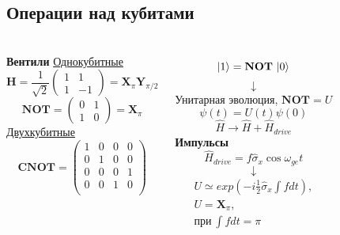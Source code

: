 \documentclass[aspectratio=169, 13pt]{beamer}
\DeclarePairedDelimiter\ket{\lvert}{\rangle}
\begin{document}
\subsection{Операции над кубитами}
\begin{frame}[c]\frametitle{\secname}\framesubtitle{\subsecname}
\begin{columns}[c]
\centering
\textbf{Вентили} 
\newline
\underline{Однокубитные}
$$
\mathbf{H} = \frac{1}{\sqrt{2}}
\begin{pmatrix}
1 & 1 \\
1 & -1
\end{pmatrix}
= \mathbf{X}_{\pi} \mathbf{Y}_{\pi / 2}
$$
$$
\mathbf{NOT} = 
\begin{pmatrix}
0 & 1 \\
1 & 0
\end{pmatrix}
= \mathbf{X}_{\pi} 
$$
\underline{Двухкубитные}
$$
\mathbf{CNOT} = 
\begin{pmatrix}
1 & 0 & 0 & 0 \\
0 & 1 & 0 & 0 \\
0 & 0 & 0 & 1 \\
0 & 0 & 1 & 0 \\
\end{pmatrix}
$$

$$
\ket{1} = \mathbf{NOT}~ \ket{0}
$$
$$
\downarrow
$$
\centering
Унитарная эволюция, $\mathbf{NOT} = U$ 
$$\psi(t) = U(t) \psi(0)$$
$$ \hat{H} \rightarrow \hat{H} + \hat{H}_{drive} $$
\centering
\textbf{Импульсы}
$$\hat{H}_{drive} = f \hat \sigma_x \cos \omega_{ge} t$$
$$ \downarrow $$
\begin{gather*} 
U \simeq exp\left( -i \frac{1}{2} \hat \sigma_x \int f dt \right),\\
U = \mathbf{X}_{\pi},\\
\text{при}~\int f dt = \pi
\end{gather*}
\end{columns}
\end{frame}
\end{document}
